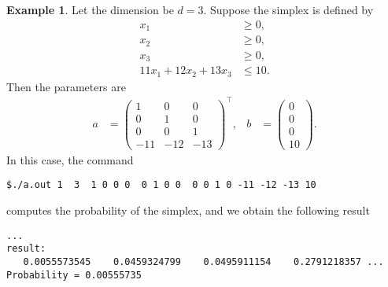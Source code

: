 \documentclass[12pt]{article}
\theoremstyle{definition}
\newtheorem{example}{Example}
\begin{document}
\begin{example}\label{2} %
Let the dimension be $d=3$.
Suppose the simplex is defined by
\begin{align*}
  x_1 &\geq 0,\\ 
  x_2 &\geq 0,\\
  x_3 &\geq 0,\\
  11x_1+12x_2+13x_3&\leq 10.
\end{align*}
Then the parameters are
\begin{align}\label{1}
  a &= 
  \begin{pmatrix} 
    1 & 0 & 0 \\ 
    0 & 1 & 0 \\ 
    0 & 0 & 1 \\ 
  -11 & -12 & -13
  \end{pmatrix}^\top, &
  b &= 
  \begin{pmatrix} 0 \\ 0 \\ 0 \\ 10 \end{pmatrix}.
\end{align}
In this case, the command
\begin{framed}
\begin{verbatim}
$./a.out 1  3  1 0 0 0  0 1 0 0  0 0 1 0 -11 -12 -13 10
\end{verbatim}
\end{framed}
computes the probability of the simplex, and we obtain the following result
\begin{framed}
\begin{verbatim}
...
result:
   0.0055573545    0.0459324799    0.0495911154    0.2791218357 ...
Probability = 0.00555735
\end{verbatim}
\end{framed}
\end{example}
\end{document}

